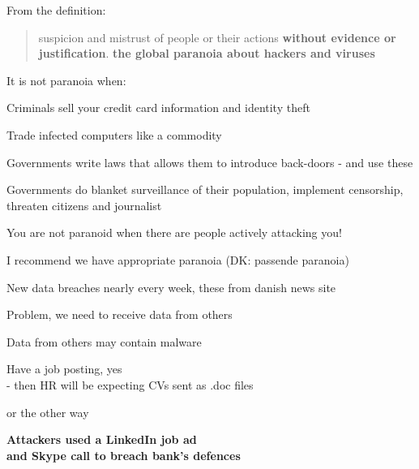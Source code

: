 \documentclass[Screen16to9,17pt]{foils}
\begin{document}

From the definition:
\begin{quote}
suspicion and mistrust of people or their actions {\bf without evidence or justification}.
{\bf the global paranoia about hackers and viruses}
\end{quote}

\begin{list1}
\item It is not paranoia when:
\begin{list2}
\item Criminals sell your credit card information and identity theft
\item Trade infected computers like a commodity
\item Governments write laws that allows them to introduce back-doors - and use these
\item Governments do blanket surveillance of their population, implement censorship, threaten citizens and journalist
\end{list2}
\end{list1}

\vskip 1cm
\centerline{You are not paranoid when there are people actively attacking you!}

I recommend we have appropriate paranoia (DK: passende paranoia)





New data breaches nearly every week, these from danish news site 

Problem, we need to receive data from others

Data from others may contain malware

Have a job posting, yes\\
- then HR will be expecting CVs sent as .doc files

\slide{}

or the other way

{\Large\bf Attackers used a LinkedIn job ad\\
and Skype call to breach bank’s defences}

{\footnotesize
{}}


\end{document}
